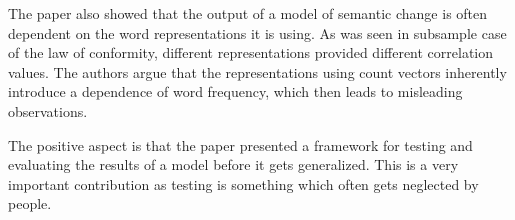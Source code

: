 \documentclass[a0,landscape]{a0poster}
\begin{document}
\begin{multicols}{4}
The paper also showed that the output of a model of semantic change is often dependent on the word representations it is using. As was seen in subsample case of the law of conformity, different representations provided different correlation values. The authors argue that the representations using count vectors inherently introduce a dependence of word frequency, which then leads to misleading observations.

The positive aspect is that the paper presented a framework for testing and evaluating the results of a model before it gets generalized. This is a very important contribution as testing is something which often gets neglected by people.

\color{DarkSlateGray} %


\nocite{*} %


\end{multicols}
\end{document}
